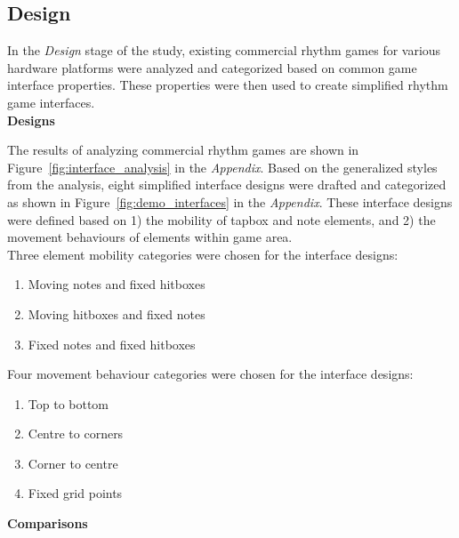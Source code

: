 \documentclass{sig-alternate}
\begin{document}
\subsection{Design}
\label{subsec:study_overview}
In the \textit{Design} stage of the study, existing commercial rhythm games for various hardware platforms were analyzed and categorized based on common game interface properties. These properties were then used to create simplified rhythm game interfaces. \\

\noindent \textbf{Designs}

The results of analyzing commercial rhythm games are shown in Figure~\ref{fig:interface_analysis} in the \textit{Appendix}. Based on the generalized styles from the analysis, eight simplified interface designs were drafted and categorized as shown in Figure~\ref{fig:demo_interfaces} in the \textit{Appendix}. These interface designs were defined based on 1) the mobility of tapbox and note elements, and 2) the movement behaviours of elements within game area.\\

Three element mobility categories were chosen for the interface designs:
\begin{enumerate}
	\item Moving notes and fixed hitboxes\vspace{-3pt}
	\item Moving hitboxes and fixed notes\vspace{-3pt}
	\item Fixed notes and fixed hitboxes\vspace{-3pt}
\end{enumerate}\vspace{+6pt}

Four movement behaviour categories were chosen for the interface designs:
\begin{enumerate}
	\item Top to bottom\vspace{-3pt}
	\item Centre to corners\vspace{-3pt}
	\item Corner to centre\vspace{-3pt}
	\item Fixed grid points\vspace{-3pt}
\end{enumerate}\vspace{+6pt}

\noindent \textbf{Comparisons}
\end{document}
